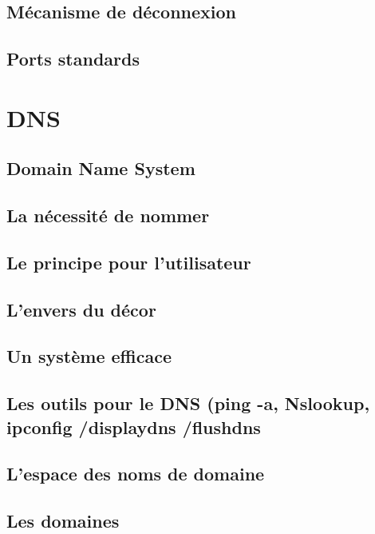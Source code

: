 \documentclass[12pt]{article}
\begin{document}
\subsection{Mécanisme de déconnexion}



\subsection{Ports standards}


\section{DNS}


\subsection{Domain Name System}


\subsection{La nécessité de nommer}


\subsection{Le principe pour l’utilisateur}


\subsection{L’envers du décor}


\subsection{Un système efficace}


\subsection{Les outils pour le DNS (ping -a, Nslookup, ipconfig /displaydns /flushdns}


\subsection{L’espace des noms de domaine}


\subsection{Les domaines}
\end{document}
